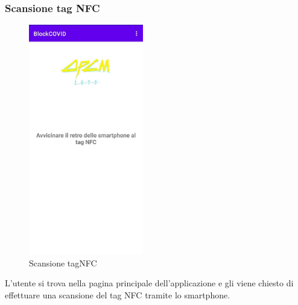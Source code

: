 \subsubsection{Scansione tag NFC}
\begin{figure}[H]
	\centering
	\includegraphics[width=5cm]{res/images/avvicinaSmartphone.png}
	\caption{Scansione tagNFC}
\end{figure}
L'utente si trova nella pagina principale dell'applicazione e gli viene chiesto di effettuare una scansione del tag NFC tramite lo smartphone. 
